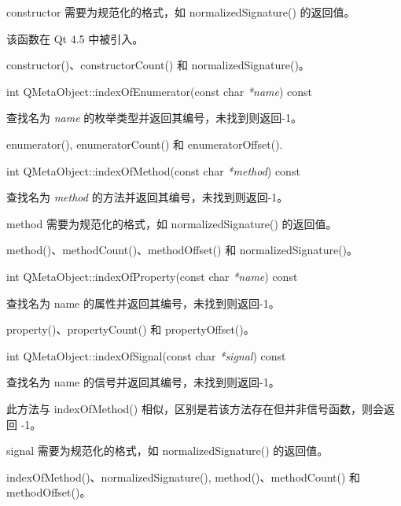 \begin{notice}
constructor 需要为规范化的格式，如 normalizedSignature() 的返回值。
\end{notice}

该函数在 Qt 4.5 中被引入。

\begin{notice}[另请参阅]
constructor()、constructorCount() 和 normalizedSignature()。
\end{notice}

int QMetaObject::indexOfEnumerator(const char \emph{*name}) const

查找名为 \emph{name} 的枚举类型并返回其编号，未找到则返回-1。

\begin{notice}
enumerator(), enumeratorCount() 和 enumeratorOffset().
\end{notice}

int QMetaObject::indexOfMethod(const char \emph{*method}) const

查找名为 \emph{method} 的方法并返回其编号，未找到则返回-1。

\begin{notice}
method 需要为规范化的格式，如 normalizedSignature() 的返回值。
\end{notice}

\begin{notice}[另请参阅]
method()、methodCount()、methodOffset() 和 normalizedSignature()。
\end{notice}

int QMetaObject::indexOfProperty(const char \emph{*name}) const

查找名为 name 的属性并返回其编号，未找到则返回-1。

\begin{notice}[另请参阅]
property()、propertyCount() 和 propertyOffset()。	
\end{notice}

int QMetaObject::indexOfSignal(const char \emph{*signal}) const

查找名为 name 的信号并返回其编号，未找到则返回-1。

此方法与 indexOfMethod() 相似，区别是若该方法存在但并非信号函数，则会返回 -1。

\begin{notice}
signal 需要为规范化的格式，如 normalizedSignature() 的返回值。	
\end{notice}

\begin{notice}[另请参阅]
indexOfMethod()、normalizedSignature(), method()、methodCount() 和 methodOffset()。
\end{notice}

